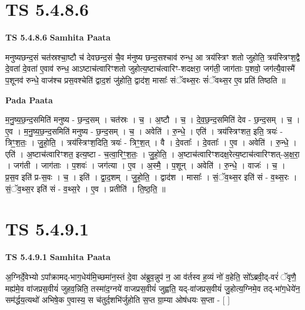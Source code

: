 \documentclass[17pt]{extarticle}
\begin{document}
\section{ TS 5.4.8.6 }

\textbf{TS 5.4.8.6 } \newline
\textbf{Samhita Paata} \newline

मनुष्यछन्द॒सं चत॑स्रश्चा॒ष्टौ च॑ देवछन्द॒सं चै॒व म॑नुष्य छन्द॒सश्चाव॑ रुन्ध॒ आ त्रय॑स्त्रिꣳ शतो जुहोति॒ त्रय॑स्त्रिꣳश॒द्वै दे॒वता॑ दे॒वता॑ ए॒वाव॑ रुन्ध॒ आऽष्टाच॑त्वारिꣳशतो जुहोत्य॒ष्टाच॑त्वारिꣳ-शदक्षरा॒ जग॑ती॒ जाग॑ताः प॒शवो॒ जग॑त्यै॒वास्मै॑ प॒शूनव॑ रुन्धे॒ वाज॑श्च प्रस॒वश्चेति॑ द्वाद॒शं जु॑होति॒ द्वाद॑श॒ मासाः᳚ संॅवथ्स॒रः सं॑ॅवथ्स॒र ए॒व प्रति॑ तिष्ठति ॥ \newline

\textbf{Pada Paata} \newline

म॒नु॒ष्य॒छ॒न्द॒समिति॑ मनुष्य - छ॒न्द॒सम् । चत॑स्रः । च॒ । अ॒ष्टौ । च॒ । दे॒व॒छ॒न्द॒समिति॑ देव - छ॒न्द॒सम् । च॒ । ए॒व । म॒नु॒ष्य॒छ॒न्द॒समिति॑ मनुष्य - छ॒न्द॒सम् । च॒ । अवेति॑ । रु॒न्धे॒ । एति॑ । त्रय॑स्त्रिꣳशत॒ इति॒ त्रयः॑ - त्रिꣳ॒॒श॒तः॒ । जु॒हो॒ति॒ । त्रय॑स्त्रिꣳश॒दिति॒ त्रयः॑ - त्रिꣳ॒॒श॒त् । वै । दे॒वताः᳚ । दे॒वताः᳚ । ए॒व । अवेति॑ । रु॒न्धे॒ । एति॑ । अ॒ष्टाच॑त्वारिꣳशत॒ इत्य॒ष्टा - च॒त्वा॒रिꣳ॒॒श॒तः॒ । जु॒हो॒ति॒ । अ॒ष्टाच॑त्वारिꣳशदक्ष॒रेत्य॒ष्टाच॑त्वारिꣳशत्-अ॒क्ष॒रा॒ । जग॑ती । जाग॑ताः । प॒शवः॑ । जग॑त्या । ए॒व । अ॒स्मै॒ । प॒शून् । अवेति॑ । रु॒न्धे॒ । वाजः॑ । च॒ । प्र॒स॒व इति॑ प्र-स॒वः । च॒ । इति॑ । द्वा॒द॒शम् । जु॒हो॒ति॒ । द्वाद॑श । मासाः᳚ । सं॒ॅव॒थ्स॒र इति॑ सं - व॒थ्स॒रः । सं॒ॅव॒थ्स॒र इति॑ सं - व॒थ्स॒रे । ए॒व । प्रतीति॑ । ति॒ष्ठ॒ति॒ ॥  \newline





\section{ TS 5.4.9.1 }

\textbf{TS 5.4.9.1 } \newline
\textbf{Samhita Paata} \newline

अ॒ग्निर्दे॒वेभ्यो ऽपा᳚क्रामद्-भाग॒धेय॑मि॒च्छमा॑न॒स्तं दे॒वा अ॑ब्रुव॒न्नुप॑ न॒ आ व॑र्तस्व ह॒व्यं नो॑ व॒हेति॒ सो᳚ऽब्रवी॒द्-वरं॑ ॅवृणै॒ मह्य॑मे॒व वा॑जप्रस॒वीयं॑ जुहव॒न्निति॒ तस्मा॑द॒ग्नये॑ वाजप्रस॒वीयं॑ जुह्वति॒ यद्-वा॑जप्रस॒वीयं॑ जु॒होत्य॒ग्निमे॒व तद्-भा॑ग॒धेये॑न॒ सम॑र्द्धय॒त्यथो॑ अभिषे॒क ए॒वास्य॒ स च॑तुर्द॒शभि॑र्जुहोति स॒प्त ग्रा॒म्या ओष॑धयः स॒प्ता - [  ] \newline
\end{document}

